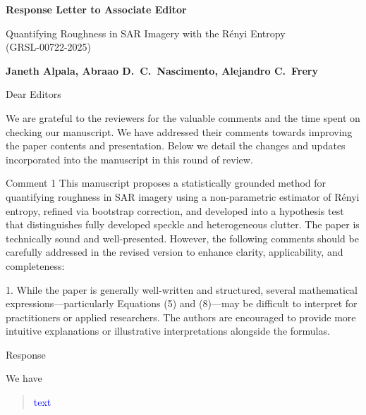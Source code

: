 \documentclass[11pt]{report}
\begin{document}
\begin{center}
\large{\textbf{Response Letter to Associate Editor}}

\vglue 0.3cm

\huge{ Quantifying Roughness in SAR Imagery with the Rényi Entropy\\ (GRSL-00722-2025)}
\end{center}

\begin{center}
\textbf{Janeth Alpala,   Abraao D.\ C.\ Nascimento, Alejandro C.\ Frery }
\end{center}

\date{\today}



\vspace{2cm}
\noindent Dear Editors
\bigskip

\noindent We are grateful to the reviewers for the valuable comments and the time spent on checking our manuscript. 
We have addressed their comments towards improving the paper contents and presentation. 
Below we detail the changes and updates incorporated into the manuscript in this round of review.

\medskip


\begin{reviewbox}{Comment 1}
This manuscript proposes a statistically grounded method for quantifying roughness in SAR imagery using a non-parametric estimator of Rényi entropy, refined via bootstrap correction, and developed into a hypothesis test that distinguishes fully developed speckle and heterogeneous clutter. The paper is technically sound and well-presented. However, the following comments should be carefully addressed in the revised version to enhance clarity, applicability, and completeness:


1. While the paper is generally well-written and structured, several mathematical expressions—particularly Equations (5) and (8)—may be difficult to interpret for practitioners or applied researchers. The authors are encouraged to provide more intuitive explanations or illustrative interpretations alongside the formulas.
\end{reviewbox}

\begin{responsebox}{Response}

We have 

\begin{quote}
	\textcolor{blue}{text  }
\end{quote}

\end{responsebox}
\end{document}
